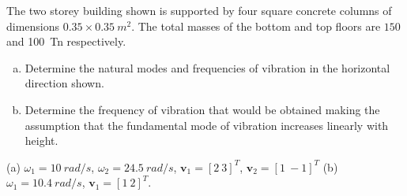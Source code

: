 
\begin{Exercise}[label={two_storey}]
The two storey building shown is supported by four square concrete columns of dimensions $0.35 \times \SI{0.35}{m^2}$. The total masses of the bottom and top floors are $150$ and \qty{100}{Tn} respectively.
\begin{enumerate}[(a)]
    \item Determine the natural modes and frequencies of vibration in the horizontal direction shown.
    \item Determine the frequency of vibration that would be obtained making the assumption that the fundamental mode of vibration increases linearly with height.
\end{enumerate}

\begin{center}
\end{center}

\shortAnswer (a) $\omega_1=\SI{10}{rad/s}$, $\omega_2=\SI{24.5}{rad/s}$, $\mathbf{v}_1 = [2\ 3]^T$, $\mathbf{v}_2 = [1\ {-}1]^T$
(b) $\omega_1=\SI{10.4}{rad/s}$, $\mathbf{v}_1 = [1\ 2]^T$.
\end{Exercise}



